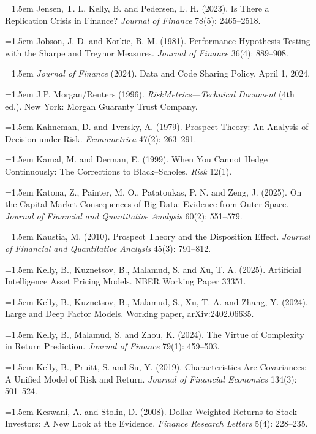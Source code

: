 \hangindent=1.5em Jensen, T. I., Kelly, B. and Pedersen, L. H. (2023). Is There a Replication Crisis in Finance? \emph{Journal of Finance} 78(5): 2465--2518.

\hangindent=1.5em Jobson, J. D. and Korkie, B. M. (1981). Performance Hypothesis Testing with the Sharpe and Treynor Measures. \emph{Journal of Finance} 36(4): 889--908.

\hangindent=1.5em \emph{Journal of Finance} (2024). Data and Code Sharing Policy, April 1, 2024.

\hangindent=1.5em J.P. Morgan/Reuters (1996). \emph{RiskMetrics---Technical Document} (4th ed.). New York: Morgan Guaranty Trust Company.

\hangindent=1.5em Kahneman, D. and Tversky, A. (1979). Prospect Theory: An Analysis of Decision under Risk. \emph{Econometrica} 47(2): 263--291.

\hangindent=1.5em Kamal, M. and Derman, E. (1999). When You Cannot Hedge Continuously: The Corrections to Black--Scholes. \emph{Risk} 12(1).

\hangindent=1.5em Katona, Z., Painter, M. O., Patatoukas, P. N. and Zeng, J. (2025). On the Capital Market Consequences of Big Data: Evidence from Outer Space. \emph{Journal of Financial and Quantitative Analysis} 60(2): 551--579.

\hangindent=1.5em Kaustia, M. (2010). Prospect Theory and the Disposition Effect. \emph{Journal of Financial and Quantitative Analysis} 45(3): 791--812.

\hangindent=1.5em Kelly, B., Kuznetsov, B., Malamud, S. and Xu, T. A. (2025). Artificial Intelligence Asset Pricing Models. NBER Working Paper 33351.

\hangindent=1.5em Kelly, B., Kuznetsov, B., Malamud, S., Xu, T. A. and Zhang, Y. (2024). Large and Deep Factor Models. Working paper, arXiv:2402.06635.

\hangindent=1.5em Kelly, B., Malamud, S. and Zhou, K. (2024). The Virtue of Complexity in Return Prediction. \emph{Journal of Finance} 79(1): 459--503.

\hangindent=1.5em Kelly, B., Pruitt, S. and Su, Y. (2019). Characteristics Are Covariances: A Unified Model of Risk and Return. \emph{Journal of Financial Economics} 134(3): 501--524.

\hangindent=1.5em Keswani, A. and Stolin, D. (2008). Dollar-Weighted Returns to Stock Investors: A New Look at the Evidence. \emph{Finance Research Letters} 5(4): 228--235.

